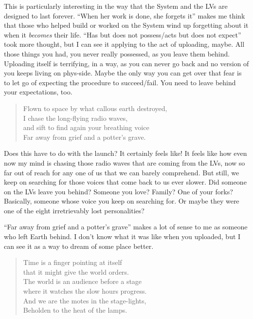 This is particularly interesting in the way that the System and the LVs are designed to last forever. ``When her work is done, she forgets it'' makes me think that those who helped build or worked on the System wind up forgetting about it when it \emph{becomes} their life. ``Has but does not possess/acts but does not expect'' took more thought, but I can see it applying to the act of uploading, maybe. All those things you had, you never really possessed, as you leave them behind. Uploading itself is terrifying, in a way, as you can never go back and no version of you keeps living on phys-side. Maybe the only way you can get over that fear is to let go of expecting the procedure to succeed/fail. You need to leave behind your expectations, too.

\begin{quote}
Flown to space by what callous earth destroyed,\\
I chase the long-flying radio waves,\\
and sift to find again your breathing voice\\
Far away from grief and a potter's grave.
\end{quote}

\noindent Does this have to do with the launch? It certainly feels like! It feels like how even now my mind is chasing those radio waves that are coming from the LVs, now so far out of reach for any one of us that we can barely comprehend. But still, we keep on searching for those voices that come back to us ever slower. Did someone on the LVs leave you behind? Someone you love? Family? One of your forks? Basically, someone whose voice you keep on searching for. Or maybe they were one of the eight irretrievably lost personalities?

``Far away from grief and a potter's grave'' makes a lot of sense to me as someone who left Earth behind. I don't know what it was like when you uploaded, but I can see it as a way to dream of some place better.

\begin{quote}
Time is a finger pointing at itself\\
that it might give the world orders.\\
The world is an audience before a stage\\
where it watches the slow hours progress.\\
And we are the motes in the stage-lights,\\
Beholden to the heat of the lamps.
\end{quote}

